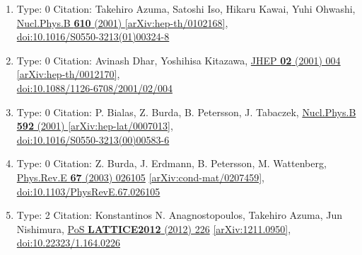 \documentclass[a4paper,10pt]{article}
\begin{document}
\begin{enumerate}
\begin{enumerate}
  \item Type: 0 Citation: Takehiro Azuma, Satoshi Iso, Hikaru Kawai, Yuhi Ohwashi, \href{https://www.doi.org/10.1016/S0550-3213(01)00324-8}{Nucl.Phys.B {\bf 610} (2001) }  \href{https://arxiv.org/abs/hep-th/0102168}{[arXiv:hep-th/0102168]},\\\href{https://www.doi.org/10.1016/S0550-3213(01)00324-8}{doi:10.1016/S0550-3213(01)00324-8}
  \item Type: 0 Citation: Avinash Dhar, Yoshihisa Kitazawa, \href{https://www.doi.org/10.1088/1126-6708/2001/02/004}{JHEP {\bf 02} (2001) 004}  \href{https://arxiv.org/abs/hep-th/0012170}{[arXiv:hep-th/0012170]},\\\href{https://www.doi.org/10.1088/1126-6708/2001/02/004}{doi:10.1088/1126-6708/2001/02/004}
  \item Type: 0 Citation: P. Bialas, Z. Burda, B. Petersson, J. Tabaczek, \href{https://www.doi.org/10.1016/S0550-3213(00)00583-6}{Nucl.Phys.B {\bf 592} (2001) }  \href{https://arxiv.org/abs/hep-lat/0007013}{[arXiv:hep-lat/0007013]},\\\href{https://www.doi.org/10.1016/S0550-3213(00)00583-6}{doi:10.1016/S0550-3213(00)00583-6}
  \item Type: 0 Citation: Z. Burda, J. Erdmann, B. Petersson, M. Wattenberg, \href{https://www.doi.org/10.1103/PhysRevE.67.026105}{Phys.Rev.E {\bf 67} (2003) 026105}  \href{https://arxiv.org/abs/cond-mat/0207459}{[arXiv:cond-mat/0207459]},\\\href{https://www.doi.org/10.1103/PhysRevE.67.026105}{doi:10.1103/PhysRevE.67.026105}
  \item Type: 2 Citation: Konstantinos N. Anagnostopoulos, Takehiro Azuma, Jun Nishimura, \href{https://www.doi.org/10.22323/1.164.0226}{PoS {\bf LATTICE2012} (2012) 226}  \href{https://arxiv.org/abs/1211.0950}{[arXiv:1211.0950]},\\\href{https://www.doi.org/10.22323/1.164.0226}{doi:10.22323/1.164.0226}

\end{enumerate}
\end{enumerate}
\end{document}
